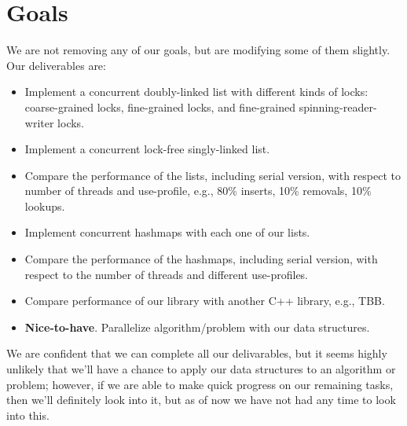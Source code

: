 \documentclass[11pt]{article}
\begin{document}
\section*{Goals}
We are not removing any of our goals, but are modifying some of them slightly.
Our deliverables are:

\begin{itemize}
\item
Implement a concurrent doubly-linked list with different kinds of locks:
coarse-grained locks, fine-grained locks, and fine-grained
spinning-reader-writer locks.
\item
Implement a concurrent lock-free singly-linked list.
\item
Compare the performance of the lists, including serial version, with respect to
number of threads and use-profile, e.g., 80\% inserts, 10\% removals, 10\%
lookups.
\item
Implement concurrent hashmaps with each one of our lists.
\item
Compare the performance of the hashmaps, including serial version, with respect
to the number of threads and different use-profiles.
\item
Compare performance of our library with another C++ library, e.g., TBB.
\item
{\bf Nice-to-have}. Parallelize algorithm/problem with our data structures.
\end{itemize}

We are confident that we can complete all our delivarables, but it seems highly
unlikely that we'll have a chance to apply our data structures to an algorithm
or problem; however, if we are able to make quick progress on our remaining
tasks, then we'll definitely look into it, but as of now we have not had any
time to look into this.
\end{document}
